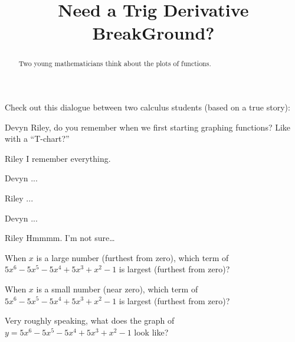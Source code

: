 \documentclass{ximera}
\title[Break-Ground:]{Need a Trig Derivative BreakGround?}
\begin{document}
\begin{abstract}
  Two young mathematicians think about the plots of functions.
\end{abstract}
\maketitle

Check out this dialogue between two calculus students (based on a true
story):

\begin{dialogue}
\item[Devyn] Riley, do you remember when we first starting graphing
  functions? Like with a ``T-chart?''
\item[Riley] I remember everything.
\item[Devyn] ...
\item[Riley] ...
\item[Devyn] ...
\item[Riley] Hmmmm. I'm not sure\dots
\end{dialogue}

\begin{problem}
  When $x$ is a large number (furthest from zero), which term of
  $5x^6-5x^5-5x^4+5x^3+x^2 -1$ is largest (furthest from zero)?
  \begin{multipleChoice}
  \end{multipleChoice}
\end{problem}

\begin{problem}
  When $x$ is a small number (near zero), which term of
  $5x^6-5x^5-5x^4+5x^3+x^2 -1$ is largest (furthest from zero)?
  \begin{multipleChoice}
  \end{multipleChoice}
\end{problem}


\begin{problem}
  Very roughly speaking, what does the graph of
  $y=5x^6-5x^5-5x^4+5x^3+x^2 -1$ look like?
  \begin{multipleChoice}
  \end{multipleChoice}
\end{problem}




\end{document}
